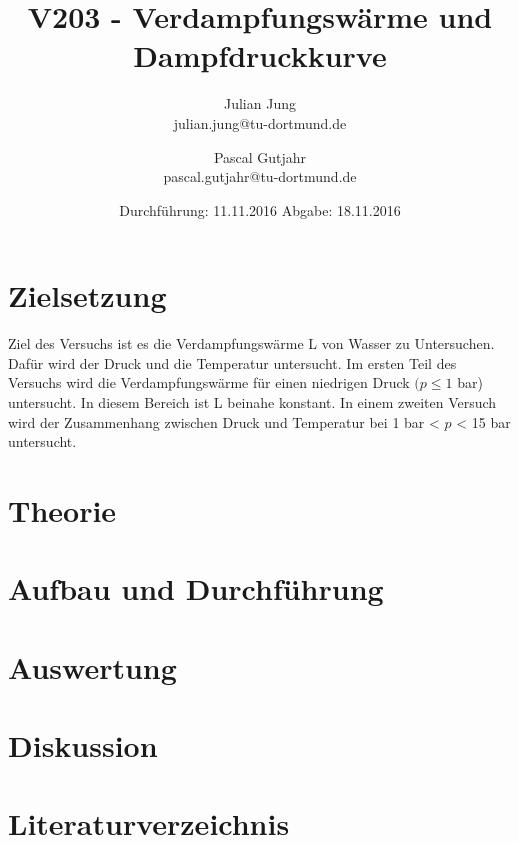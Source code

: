 

\title{V203 - Verdampfungswärme und Dampfdruckkurve}
\author{Julian Jung \\ julian.jung@tu-dortmund.de
  \and Pascal Gutjahr \\ pascal.gutjahr@tu-dortmund.de}
  \date{Durchführung: 11.11.2016
  \hspace{3em}
  Abgabe: 18.11.2016}
  
\maketitle
\newpage
\tableofcontents
\newpage
\section{Zielsetzung}
Ziel des Versuchs ist es die Verdampfungswärme L von Wasser zu Untersuchen.
Dafür wird der Druck und die Temperatur untersucht. Im ersten Teil des Versuchs
wird die Verdampfungswärme für einen niedrigen Druck $(p\le 1$ bar) untersucht. In
diesem Bereich ist L beinahe konstant. In einem zweiten Versuch wird der Zusammenhang
zwischen Druck und Temperatur bei 1 bar < $p$ < 15 bar untersucht.
\section{Theorie}

\section{Aufbau und Durchführung}
%
\newpage %
\section{Auswertung}

\section{Diskussion}
%
\section{Literaturverzeichnis}

